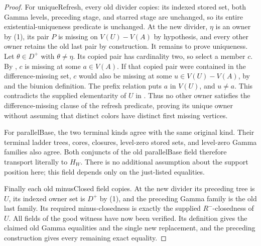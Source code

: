 \begin{proof}
For uniqueRefresh, every old divider copies: its indexed stored set,
both Gamma levels, preceding stage, and starred stage are unchanged,
so its entire existential-uniqueness predicate is unchanged.
At the new divider, $\eta$ is an owner by (1), its pair $P$ is missing
on $V(U)-V(A)$ by hypothesis, and every other owner retains the old
last pair by construction. It remains to prove uniqueness.
Let $\theta\in D^+$ with $\theta\ne\eta$. Its copied pair has
cardinality two, so select a member $c$. By
, $c$ is missing at some
$a\in V(A)$. If that copied pair were contained in the difference-missing
set, $c$ would also be missing at some $u\in V(U)-V(A)$, by
 and the biunion definition.
The prefix relation puts $a$ in $V(U)$, and $u\ne a$.
This contradicts the supplied elementarity of $U$ in
. Thus no other owner satisfies
the difference-missing clause of the refresh predicate, proving its
unique owner without assuming that distinct colors have distinct
first missing vertices.

For parallelBase, the two terminal kinds agree with the same original
kind. Their terminal ladder trees, cores, closures, level-zero stored
sets, and level-zero Gamma families also agree. Both conjuncts of the
old parallelBase field therefore transport literally to $H_W$.
There is no additional assumption about the support position here;
this field depends only on the just-listed equalities.

Finally each old minusClosed field copies. At the new divider its
preceding tree is $U$, its indexed owner set is $D^+$ by (1), and
the preceding Gamma family is the old last family. Its required
minus-closedness is exactly the supplied $R^-$-closedness of $U$.
All fields of the good witness have now been verified. Its definition
gives the claimed old Gamma equalities and the single new replacement,
and the preceding construction gives every remaining exact equality.
\end{proof}
